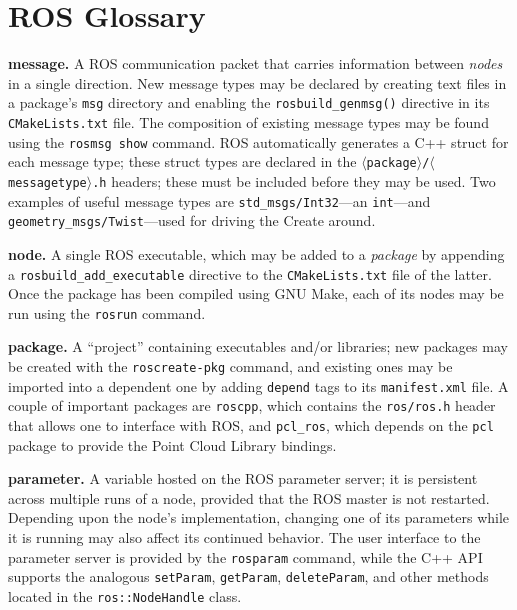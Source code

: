 \documentclass[12pt]{report}
\begin{document}
\section{ROS Glossary}
\begin{itemize}
\begin{sloppypar}
\item{\textbf{message.} A ROS communication packet that carries information between \textit{nodes} in a single direction.  New message types may be declared by creating text files in a package's \texttt{msg} directory and enabling the \texttt{rosbuild\_genmsg()} directive in its \texttt{CMakeLists.txt} file.  The composition of existing message types may be found using the \texttt{rosmsg show} command.  ROS automatically generates a C++ struct for each message type; these struct types are declared in the \texttt{$\langle$package$\rangle$/$\langle$messagetype$\rangle$.h} headers; these must be included before they may be used.  Two examples of useful message types are \texttt{std\_msgs/Int32}---an \texttt{int}---and \texttt{geometry\_msgs/Twist}---used for driving the Create around.}
\item{\textbf{node.} A single ROS executable, which may be added to a \textit{package} by appending a \texttt{rosbuild\_add\_executable} directive to the \texttt{CMakeLists.txt} file of the latter.  Once the package has been compiled using GNU Make, each of its nodes may be run using the \texttt{rosrun} command.}
\end{sloppypar}
\item{\textbf{package.} A ``project'' containing executables and/or libraries; new packages may be created with the \texttt{roscreate-pkg} command, and existing ones may be imported into a dependent one by adding \texttt{depend} tags to its \texttt{manifest.xml} file.  A couple of important packages are \texttt{roscpp}, which contains the \texttt{ros/ros.h} header that allows one to interface with ROS, and \texttt{pcl\_ros}, which depends on the \texttt{pcl} package to provide the Point Cloud Library bindings.}
\item{\textbf{parameter.} A variable hosted on the ROS parameter server; it is persistent across multiple runs of a node, provided that the ROS master is not restarted.  Depending upon the node's implementation, changing one of its parameters while it is running may also affect its continued behavior.  The user interface to the parameter server is provided by the \texttt{rosparam} command, while the C++ API supports the analogous \texttt{setParam}, \texttt{getParam}, \texttt{deleteParam}, and other methods located in the \texttt{ros::NodeHandle} class.}

\end{itemize}
\end{document}
